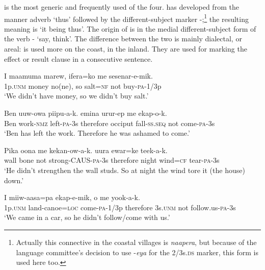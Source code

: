  is the most generic and frequently used of the four.  has developed from the manner adverb  `thus' followed by the different-subject marker -;\footnote{Actually this connective in the coastal villages is \textit{naapera}, but because of the language committee's decision to use -\textit{eya} for the 2/3s.\textsc{ds} marker, this form is used here too.} the resulting meaning is `it being thus'. The origin of  is in the medial different-subject form of the verb - `say, think'. The difference between the two is mainly dialectal, or areal:  is used more on the coast,  in the inland. They are used for marking the effect or result clause in a consecutive sentence. 

\ea%
\label{ex:3:x731}
\gll I maamuma marew,  ifera=ko me sesenar-e-mik. \\
1p.\textsc{unm} money no(ne), so salt=\textsc{nf} not buy-\textsc{pa}-1/3p\\
\glt`We didn't have money, so we didn't buy salt.'
\z

\ea%
\label{ex:3:x732}
\gll Ben uuw-owa piipu-a-k.  emina urur-ep me ekap-o-k.\\
Ben work-\textsc{nmz} left-\textsc{pa}-3s therefore occiput fall-\textsc{ss}.\textsc{seq} not come-\textsc{pa}-3s\\
\glt`Ben has left the work. Therefore he was ashamed to come.'
\z

\ea%
\label{ex:3:x735}
\gll Pika oona me kekan-ow-a-k.  uura ewar=ke teek-a-k.\\
wall bone not strong-CAUS-\textsc{pa}-3s therefore night wind=\textsc{cf} tear-\textsc{pa}-3s\\
\glt`He didn't strengthen the wall studs. So at night the wind tore it (the house) down.'
\z

\ea%
\label{ex:3:x1413}
\gll I miiw-aasa=pa ekap-e-mik,  o me yook-a-k.\\
1p.\textsc{unm} land-canoe=\textsc{loc} come-\textsc{pa}-1/3p therefore 3s.\textsc{unm} not follow.us-\textsc{pa}-3s\\
\glt`We came in a car, so he didn't follow/come with us.'
\z

